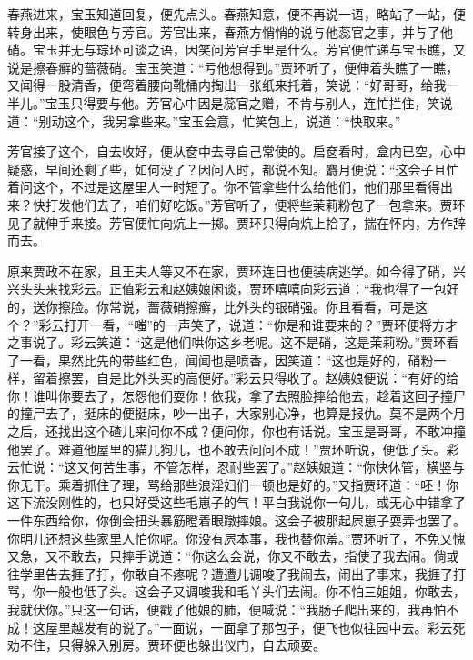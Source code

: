 春燕进来，宝玉知道回复，便先点头。春燕知意，便不再说一语，略站了一站，便转身出来，使眼色与芳官。芳官出来，春燕方悄悄的说与他蕊官之事，并与了他硝。宝玉并无与琮环可谈之语，因笑问芳官手里是什么。芳官便忙递与宝玉瞧，又说是擦春癣的蔷薇硝。宝玉笑道：``亏他想得到。''贾环听了，便伸着头瞧了一瞧，又闻得一股清香，便弯着腰向靴桶内掏出一张纸来托着，笑说：``好哥哥，给我一半儿。''宝玉只得要与他。芳官心中因是蕊官之赠，不肯与别人，连忙拦住，笑说道：``别动这个，我另拿些来。''宝玉会意，忙笑包上，说道：``快取来。''

芳官接了这个，自去收好，便从奁中去寻自己常使的。启奁看时，盒内已空，心中疑惑，早间还剩了些，如何没了？因问人时，都说不知。麝月便说：``这会子且忙着问这个，不过是这屋里人一时短了。你不管拿些什么给他们，他们那里看得出来？快打发他们去了，咱们好吃饭。''芳官听了，便将些茉莉粉包了一包拿来。贾环见了就伸手来接。芳官便忙向炕上一掷。贾环只得向炕上拾了，揣在怀内，方作辞而去。

原来贾政不在家，且王夫人等又不在家，贾环连日也便装病逃学。如今得了硝，兴兴头头来找彩云。正值彩云和赵姨娘闲谈，贾环嘻嘻向彩云道：``我也得了一包好的，送你擦脸。你常说，蔷薇硝擦癣，比外头的银硝强。你且看看，可是这个？''彩云打开一看，``嗤''的一声笑了，说道：``你是和谁要来的？''贾环便将方才之事说了。彩云笑道：``这是他们哄你这乡老呢。这不是硝，这是茉莉粉。''贾环看了一看，果然比先的带些红色，闻闻也是喷香，因笑道：``这也是好的，硝粉一样，留着擦罢，自是比外头买的高便好。''彩云只得收了。赵姨娘便说：``有好的给你！谁叫你要去了，怎怨他们耍你！依我，拿了去照脸摔给他去，趁着这回子撞尸的撞尸去了，挺床的便挺床，吵一出子，大家别心净，也算是报仇。莫不是两个月之后，还找出这个碴儿来问你不成？便问你，你也有话说。宝玉是哥哥，不敢冲撞他罢了。难道他屋里的猫儿狗儿，也不敢去问问不成！''贾环听说，便低了头。彩云忙说：``这又何苦生事，不管怎样，忍耐些罢了。''赵姨娘道：``你快休管，横竖与你无干。乘着抓住了理，骂给那些浪淫妇们一顿也是好的。''又指贾环道：``呸！你这下流没刚性的，也只好受这些毛崽子的气！平白我说你一句儿，或无心中错拿了一件东西给你，你倒会扭头暴筋瞪着眼蹾摔娘。这会子被那起屄崽子耍弄也罢了。你明儿还想这些家里人怕你呢。你没有屄本事，我也替你羞。''贾环听了，不免又愧又急，又不敢去，只摔手说道：``你这么会说，你又不敢去，指使了我去闹。倘或往学里告去捱了打，你敢自不疼呢？遭遭儿调唆了我闹去，闹出了事来，我捱了打骂，你一般也低了头。这会子又调唆我和毛丫头们去闹。你不怕三姐姐，你敢去，我就伏你。''只这一句话，便戳了他娘的肺，便喊说：``我肠子爬出来的，我再怕不成！这屋里越发有的说了。''一面说，一面拿了那包子，便飞也似往园中去。彩云死劝不住，只得躲入别房。贾环便也躲出仪门，自去顽耍。

